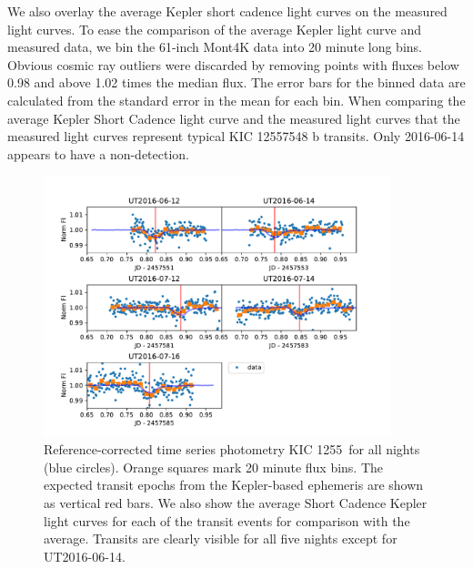 \documentclass[preprint]{aastex61}
\newcommand{\shStar}{KIC 1255}
\begin{document}
We also overlay the average Kepler short cadence light curves on the measured light curves.
To ease the comparison of the average Kepler light curve and measured data, we bin the 61-inch Mont4K data into 20 minute long bins.
Obvious cosmic ray outliers were discarded by removing points with fluxes below 0.98 and above 1.02 times the median flux.
The error bars for the binned data are calculated from the standard error in the mean for each bin.
When comparing the average Kepler Short Cadence light curve and the measured light curves that the measured light curves represent typical KIC 12557548 b transits.
Only 2016-06-14 appears to have a non-detection.

\begin{figure}
\begin{centering}
\includegraphics[width=0.9\textwidth]{images/all_kic1255_phot/all_kic1255_refcor.pdf}
\caption{Reference-corrected time series photometry \shStar\ for all nights (blue circles).
Orange squares mark 20 minute flux bins.
The expected transit epochs from the Kepler-based ephemeris \citep{vanWerkhoven2014} are shown as vertical red bars.
We also show the average Short Cadence Kepler light curves for each of the transit events for comparison with the average.
Transits are clearly visible for all five nights except for UT2016-06-14.}\label{fig:allNightrefCorrect}
\end{centering}
\end{figure}
\end{document}
